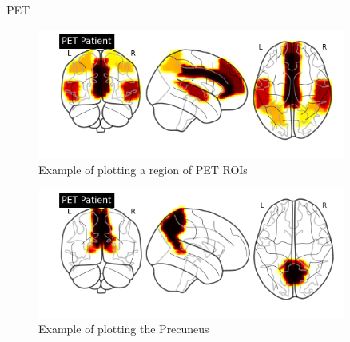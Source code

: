 \documentclass[final]{beamer}
\newlength{\sepwid}
\newlength{\onecolwid}
\newlength{\twocolwid}
\begin{document}
\begin{frame}[t]
\begin{columns}[t]
\begin{column}{\twocolwid}
\begin{columns}[t,totalwidth=\twocolwid]
\begin{column}{\onecolwid}
\begin{block}{PET}
                \begin{figure}
                    \includegraphics[width=1.0\linewidth]{images/petROI.png}
                    \caption{Example of plotting a region of PET ROIs}
                \end{figure}
                \begin{figure}
                    \includegraphics[width=1.0\linewidth]{images/precun.png}
                    \caption{Example of plotting the Precuneus}
                \end{figure}

            \end{block}
            
        
        \end{column} %
    
    \end{columns} %
    
    \end{column} %
    
    \begin{column}{\sepwid}\end{column} %
    
    \begin{column}{\onecolwid} %
    

\end{column}
\end{columns}
\end{frame}
\end{document}
